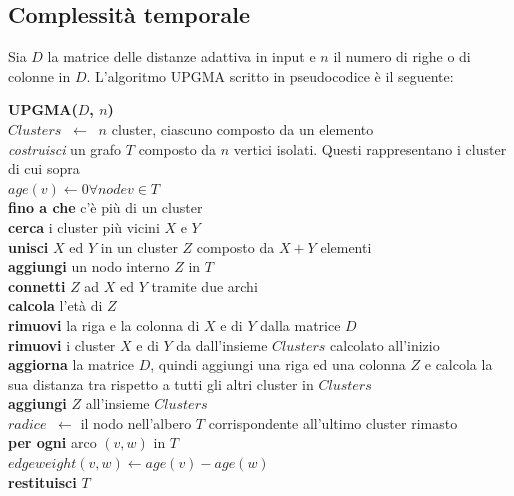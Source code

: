 \subsection{Complessità temporale}
Sia $D$ la matrice delle distanze adattiva in input e $n$ il numero di righe o di colonne in $D$. L'algoritmo UPGMA scritto in pseudocodice è il seguente:
\begin{framed}\noindent
  \textbf{UPGMA($D$, $n$)}\\
   $Clusters \;\; \leftarrow \;\; n$ cluster, ciascuno composto da un elemento \\
  \textit{costruisci} un grafo $T$ composto da $n$ vertici isolati. Questi rappresentano i cluster di cui sopra\\
  $age(v)\leftarrow 0 \forall node v \in T$\\
  \textbf{fino a che} c'è più di un cluster\\
  \indent \textbf{cerca} i cluster più vicini $X$ e $Y$\\
  \indent \textbf{unisci} $X$ ed $Y$ in un cluster $Z$ composto da $X+Y$ elementi\\
  \indent \textbf{aggiungi} un nodo interno $Z$ in $T$\\
  \indent \textbf{connetti} $Z$ ad $X$ ed $Y$ tramite due archi \\
  \indent \textbf{calcola} l'età di $Z$\\
  \indent \textbf{rimuovi} la riga e la colonna di $X$ e di $Y$ dalla matrice $D$ \\
  \indent \textbf{rimuovi} i cluster $X$ e di $Y$  da dall'insieme $Clusters$ calcolato all'inizio \\
  \indent \textbf{aggiorna} la matrice $D$, quindi aggiungi una riga ed una colonna $Z$ e calcola la sua distanza tra rispetto a tutti gli altri cluster in $Clusters$ \\
  \indent \textbf{aggiungi} $Z$ all'insieme $Clusters$ \\
  $radice \;\; \leftarrow $ il nodo nell'albero $T$ corrispondente all'ultimo cluster rimasto \\
  \textbf{per ogni} arco $(v, w)$ in $T$\\
  \indent $edgeweight(v, w) \leftarrow age(v) - age(w) $\\
  \textbf{restituisci} $T$
\end{framed}